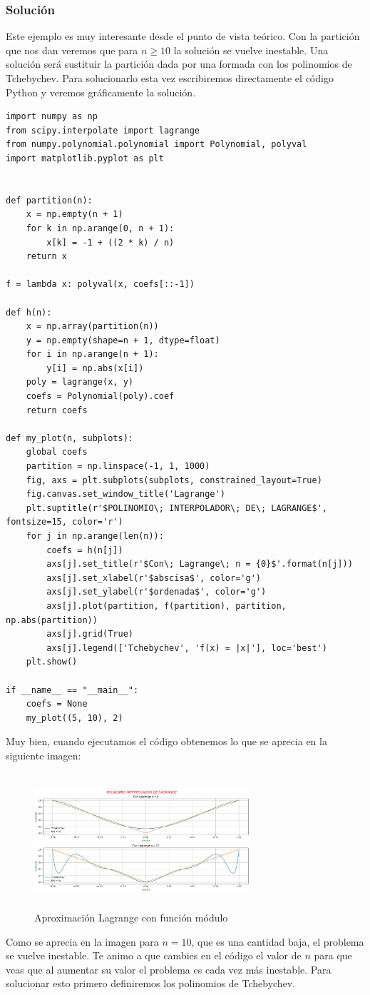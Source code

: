 \documentclass[12pt,a4paper,oneside]{scrbook}
\newcounter{ns}
\begin{document}
\subsubsection*{Solución}
Este ejemplo es muy interesante desde el punto de vista teórico. Con la partición que nos dan veremos que para $n\geq 10$ la solución se vuelve inestable. Una solución será sustituir la partición dada por una formada con los polinomios de Tchebychev.
Para solucionarlo esta vez escribiremos directamente el código Python y veremos gráficamente la solución.\\
\begin{lstlisting}[frame=none]
import numpy as np
from scipy.interpolate import lagrange
from numpy.polynomial.polynomial import Polynomial, polyval
import matplotlib.pyplot as plt


def partition(n):
    x = np.empty(n + 1)
    for k in np.arange(0, n + 1):
        x[k] = -1 + ((2 * k) / n)
    return x

f = lambda x: polyval(x, coefs[::-1])

def h(n):
    x = np.array(partition(n))
    y = np.empty(shape=n + 1, dtype=float)
    for i in np.arange(n + 1):
        y[i] = np.abs(x[i])
    poly = lagrange(x, y)
    coefs = Polynomial(poly).coef
    return coefs

def my_plot(n, subplots):
    global coefs
    partition = np.linspace(-1, 1, 1000)
    fig, axs = plt.subplots(subplots, constrained_layout=True)
    fig.canvas.set_window_title('Lagrange')
    plt.suptitle(r'$POLINOMIO\; INTERPOLADOR\; DE\; LAGRANGE$', fontsize=15, color='r')
    for j in np.arange(len(n)):
        coefs = h(n[j])
        axs[j].set_title(r'$Con\; Lagrange\; n = {0}$'.format(n[j]))
        axs[j].set_xlabel(r'$abscisa$', color='g')
        axs[j].set_ylabel(r'$ordenada$', color='g')
        axs[j].plot(partition, f(partition), partition, np.abs(partition))
        axs[j].grid(True)
        axs[j].legend(['Tchebychev', 'f(x) = |x|'], loc='best')
    plt.show()

if __name__ == "__main__":
    coefs = None
    my_plot((5, 10), 2)
\end{lstlisting}
Muy bien, cuando ejecutamos el código obtenemos lo que se aprecia en la siguiente imagen:
\begin{figure}[h!]
    \centering
    \includegraphics[width=8cm,height=5cm]{lagrange.png}
    \caption{Aproximación Lagrange con función módulo}
    \label{fig:modulo}
\end{figure}
Como se aprecia en la imagen para $n=10$, que es una cantidad baja, el problema se vuelve inestable. Te animo a que cambies en el código el valor de $n$ para que veas que al aumentar su valor el problema es cada vez más inestable. Para solucionar esto primero definiremos los polinomios de Tchebychev.
\end{document}
